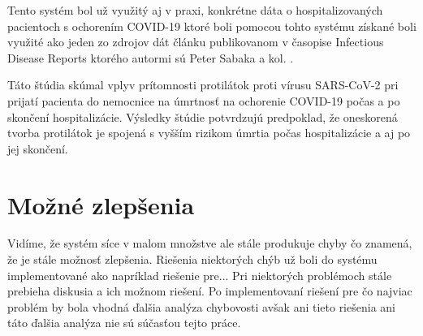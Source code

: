Tento systém bol už využitý aj v praxi, konkrétne dáta o hospitalizovaných pacientoch s ochorením COVID-19 ktoré boli pomocou tohto systému získané boli využité ako jeden zo zdrojov dát článku publikovanom v časopise Infectious Disease Reports ktorého autormi sú Peter Sabaka a kol. \cite{sabaka}.

Táto štúdia skúmal vplyv prítomnosti protilátok proti vírusu SARS-CoV-2 pri prijatí pacienta do nemocnice na úmrtnosť na ochorenie COVID-19 počas a po skončení hospitalizácie. Výsledky štúdie potvrdzujú predpoklad, že oneskorená tvorba protilátok je spojená s vyšším rizikom úmrtia počas hospitalizácie a aj po jej skončení. 

\section{Možné zlepšenia}

Vidíme, že systém síce v malom množstve ale stále produkuje chyby čo znamená, že je stále možnosť zlepšenia. Riešenia niektorých chýb už boli do systému implementované ako napríklad riešenie pre... Pri niektorých problémoch stále prebieha diskusia a ich možnom riešení. Po implementovaní riešení pre čo najviac problém by bola vhodná ďalšia analýza chybovosti avšak ani tieto riešenia ani táto ďalšia analýza nie sú súčasťou tejto práce.
